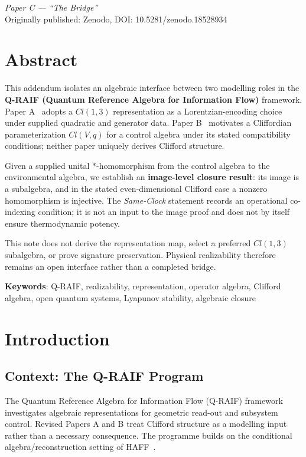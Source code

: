 \documentclass[12pt,a4paper,openany]{book}
\begin{document}
\begin{center}
\textit{Paper C --- ``The Bridge''}\\[0.5em]
Originally published: Zenodo, DOI: 10.5281/zenodo.18528934
\end{center}

\bigskip

\section*{Abstract}
This addendum isolates an algebraic interface between two modelling roles in the \textbf{Q-RAIF (Quantum Reference Algebra for Information Flow)} framework.
Paper A~\cite{Liu2026QRAIF_A} adopts a $Cl(1,3)$ representation as a Lorentzian-encoding choice under supplied quadratic and generator data.
Paper B~\cite{Liu2026QRAIF_B} motivates a Cliffordian parameterization $Cl(V,q)$ for a control algebra under its stated compatibility conditions; neither paper uniquely derives Clifford structure.

Given a supplied unital $*$-homomorphism from the control algebra to the environmental algebra, we establish an \textbf{image-level closure result}: its image is a subalgebra, and in the stated even-dimensional Clifford case a nonzero homomorphism is injective.
The \emph{Same-Clock} statement records an operational co-indexing condition; it is not an input to the image proof and does not by itself ensure thermodynamic potency.

This note does not derive the representation map, select a preferred $Cl(1,3)$ subalgebra, or prove signature preservation.  Physical realizability therefore remains an open interface rather than a completed bridge.

\medskip
\noindent\textbf{Keywords}: Q-RAIF, realizability, representation, operator algebra, Clifford algebra, open quantum systems, Lyapunov stability, algebraic closure


\section{Introduction}
\label{C-sec:intro}

\subsection{Context: The Q-RAIF Program}

The Quantum Reference Algebra for Information Flow (Q-RAIF) framework investigates algebraic representations for geometric read-out and subsystem control.  Revised Papers A and B treat Clifford structure as a modelling input rather than a necessary consequence.  The programme builds on the conditional algebra/reconstruction setting of HAFF~\cite{Liu2026PaperA,Liu2026PaperB}.
\end{document}
